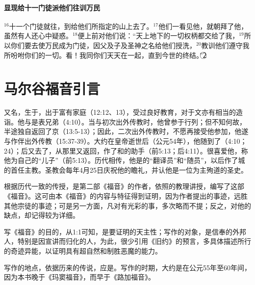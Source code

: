 \subsubsection{显现给十一门徒派他们往训万民}
$^{16}$十一个门徒就往\UL[加里肋亚]，到\UL[耶稣]给他们所指定的山上去了。$^{17}$他们一看见他，就朝拜了他，虽然有人还心中疑惑。$^{18}$\UL[耶稣]便上前对他们说：“天上地下的一切权柄都交给了我，$^{19}$所以你们要去使万民成为门徒，因父及子及圣神之名给他们授洗，$^{20}$教训他们遵守我所吩咐你们的一切。看！我同你们天天在一起，直到今世的终结。”\textcircled{2}


\chapter*{马尔谷福音引言}
\UL[马尔谷]又名\UL[若望]，生于\UL[耶路撒冷]，出于富有家庭（12:12、13），受过良好教育，对于\UL[希腊]文亦有相当的造诣。他与\UL[巴尔纳伯]是表兄弟（4:10）。当\UL[保禄]与\UL[巴尔纳伯]初次出外传教时，他曾参于行列；但不知何故，半途独自返回了\UL[耶]京（13:5-13）；因此，\UL[保禄]二次出外传教时，不愿再接受他参加，他遂与\UL[巴尔纳伯]作伴出外传教（15:37-39）。大约在\UL[喀劳狄]皇帝逝世后（公元54年），他随\UL[伯多禄]到了\UL[罗马]（4:10；24）；后又去了\UL[小亚细亚]，从那里又返回\UL[罗马]，作了\UL[伯多禄]和\UL[保禄]的助手（前5:13；后4:11）。\UL[伯多禄]很喜爱他，称他为自己的“儿子”（前5:13）。历代相传，他是\UL[伯多禄]的“翻译员”和“随员”，以后作了\UL[埃及]\UL[亚历山大]\UL[里亚]城的首任主教。圣教会每年4月25日庆祝他的瞻礼，并认他是一位为主殉道的圣史。

根据历代一致的传授，\UL[马尔谷]是第二部《福音》的作者，依照\UL[伯多禄]的教理讲授，编写了这部《福音》。这可由本《福音》的内容与特征得到证明，因为作者提出\UL[伯多禄]的事迹，远胜其他宗徒的事迹；可是另一方面，凡对\UL[伯多禄]有光彩的事，多次略而不提；反之，对他的缺点，却记得较为详细。

\UL[马尔谷]写《福音》的目的，从1:1可知，是要证明\UL[基督]的天主性；写作的对象，是信奉\UL[基督]的外邦人，特别是因\UL[伯多禄]宣讲而归化的\UL[罗马]人，为此，\UL[马尔谷]很少引用《旧约》的预言，多具体描述\UL[基督]所行的奇迹异能，以证明\UL[基督]具有超自然和制胜恶魔的能力。

写作的地点，依据历来的传说，应是\UL[罗马]。写作的时期，大约是在公元55年至60年间，因为本书晚于《玛窦福音》，而早于《路加福音》。

